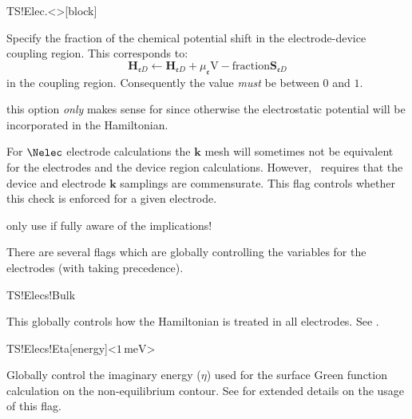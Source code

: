 \begin{fdfentry}{TS!Elec.<>}[block]
\begin{fdfoptions}
    \option[V-fraction]%

    Specify the fraction of the chemical potential shift in the
    electrode-device coupling region. This corresponds to:
    \begin{equation}
      \mathbf H_{\mathfrak eD} \leftarrow \mathbf H_{\mathfrak eD} +
      \mu_{\mathfrak e} \mathrm{V-fraction} \mathbf S_{\mathfrak eD}
    \end{equation}
    in the coupling region. Consequently the value \emph{must} be
    between $0$ and $1$.

    \note this option \emph{only} makes sense for
     since otherwise the electrostatic
    potential will be incorporated in the Hamiltonian.

    For $\Nelec$ electrode calculations the $\mathbf k$ mesh will sometimes
    not be equivalent for the electrodes and the device region
    calculations. However, \tsiesta\ requires that the device and
    electrode $\mathbf k$ samplings are commensurate. This flag
    controls whether this check is enforced for a given electrode.

    \note only use if fully aware of the implications!

  \end{fdfoptions}
  
\end{fdfentry}

There are several flags which are globally controlling the variables
for the electrodes (with  taking precedence).

\begin{fdflogicalT}{TS!Elecs!Bulk}

  This globally controls how the Hamiltonian is treated in all
  electrodes. 
  See .
  
\end{fdflogicalT}

\begin{fdfentry}{TS!Elecs!Eta}[energy]<$1\,\mathrm{meV}$>
  
  Globally control the imaginary energy ($\eta$) used for the surface
  Green function calculation on the non-equilibrium contour.
  See  for extended details on the usage of this
  flag. 
  
\end{fdfentry}

